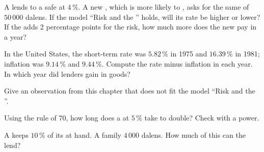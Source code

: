 \begin{exercise}[$\star\star$]\label{exo:g8:banks-saving-interest:7}
A  lends to a safe  at $4\,\%$. A new , which is more likely to , asks for the same
 of $50\,000$ dalens. If the model ``Risk and the '' holds, will its rate be higher or
lower? If the  adds 2 percentage points for the risk, how much more  does the new 
pay in a year?
\end{exercise}

\begin{exercise}[$\star\star$]\label{exo:g8:banks-saving-interest:8}
In the United States, the short-term rate was $5.82\,\%$ in 1975 and $16.39\,\%$ in 1981; inflation
was $9.14\,\%$ and $9.44\,\%$. Compute the rate minus inflation in each year. In which year did
lenders gain in goods?
\end{exercise}

\begin{exercise}[$\star\star$]\label{exo:g8:banks-saving-interest:9}
Give an observation from this chapter that does not fit the model ``Risk and the ''.
\end{exercise}

\begin{exercise}[$\star\star\star$]\label{exo:g8:banks-saving-interest:10}
Using the rule of 70, how long does a  at $5\,\%$  take to double? Check with
a power.
\end{exercise}

\begin{exercise}[$\star\star\star$]\label{exo:g8:banks-saving-interest:11}
A  keeps $10\,\%$ of its  at hand. A family  $4\,000$ dalens. How much of this
 can the  lend?
\end{exercise}


